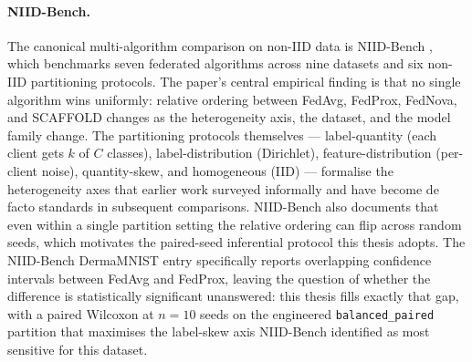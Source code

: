 \documentclass[11pt,a4paper]{article}
\begin{document}
\paragraph{NIID-Bench.}
The canonical multi-algorithm comparison on non-IID data is NIID-Bench
\citep{li2022niidbench}, which benchmarks seven federated algorithms across
nine datasets and six non-IID partitioning protocols. The paper's central
empirical finding is that no single algorithm wins uniformly: relative
ordering between FedAvg, FedProx, FedNova, and SCAFFOLD changes as the
heterogeneity axis, the dataset, and the model family change. The
partitioning protocols themselves --- label-quantity (each client gets $k$
of $C$ classes), label-distribution (Dirichlet), feature-distribution (per-
client noise), quantity-skew, and homogeneous (IID) --- formalise the
heterogeneity axes that earlier work surveyed informally and have become
de facto standards in subsequent comparisons. NIID-Bench also documents
that even within a single partition setting the relative ordering can flip
across random seeds, which motivates the paired-seed inferential protocol
this thesis adopts. The NIID-Bench DermaMNIST entry specifically reports
overlapping confidence intervals between FedAvg and FedProx, leaving the
question of whether the difference is statistically significant unanswered:
this thesis fills exactly that gap, with a paired Wilcoxon at $n=10$ seeds
on the engineered \texttt{balanced\_paired} partition that maximises the
label-skew axis NIID-Bench identified as most sensitive for this dataset.
\end{document}
